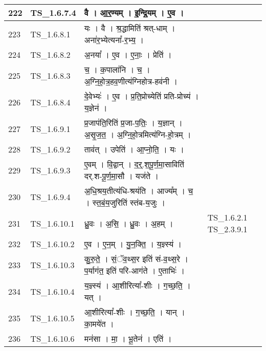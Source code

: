 \documentclass[17pt]{extarticle}
\begin{document}
\begin{longtable}{||p{0.4in}||p{0.9in}||p{4.0in}||p{0.9in}||}
        \hline
            222 & TS\_1.6.7.4 & वै   ।   आ॒र॒ण्यम्   ।   इ॒न्द्रि॒यम्   ।   ए॒व   ।    &      \\
        \hline
            223 & TS\_1.6.8.1 & यः   ।   वै   ।   श्र॒द्धामिति॑ श्रत्{-}धाम्   ।   अना॑र॒भ्येत्यना᳚{-}र॒भ्य॒   ।    &      \\
        \hline
            224 & TS\_1.6.8.2 & अ॒नया᳚   ।   ए॒व   ।   ए॒नाः॒   ।   प्रेति॑   ।    &      \\
        \hline
            225 & TS\_1.6.8.3 & च॒   ।   क॒पाला॑नि   ।   च॒   ।   अ॒ग्नि॒हो॒त्र॒हव॒णीत्य॑ग्निहोत्र{-}हव॑नी   ।    &      \\
        \hline
            226 & TS\_1.6.8.4 & दे॒वेभ्यः॑   ।   ए॒व   ।   प्र॒ति॒प्रोच्येति॑ प्रति{-}प्रोच्य॑   ।   य॒ज्ञेन॑   ।    &      \\
        \hline
            227 & TS\_1.6.9.1 & प्र॒जाप॑ति॒रिति॑ प्र॒जा{-}प॒तिः॒   ।   य॒ज्ञान्   ।   अ॒सृ॒ज॒त॒   ।   अ॒ग्नि॒हो॒त्रमित्य॑ग्नि{-}हो॒त्रम्   ।    &      \\
        \hline
            228 & TS\_1.6.9.2 & ताव॑त्   ।   उपेति॑   ।   आ॒प्नो॒ति॒   ।   यः   ।    &      \\
        \hline
            229 & TS\_1.6.9.3 & ए॒वम्   ।   वि॒द्वान्   ।   द॒र्॒.श॒पू॒र्ण॒मा॒साविति॑ दर्.श{-}पू॒र्ण॒मा॒सौ   ।   यज॑ते   ।    &      \\
        \hline
            230 & TS\_1.6.9.4 & अ॒धि॒श्रय॒तीत्य॑धि{-}श्रय॑ति   ।   आज्य᳚म्   ।   च॒   ।   स्त॒बं॒य॒जुरिति॑ स्तंब{-}य॒जुः   ।    &      \\
        \hline
            231 & TS\_1.6.10.1 & ध्रु॒वः   ।   अ॒सि॒   ।   ध्रु॒वः   ।   अ॒हम्   ।    & TS\_1.6.2.1  TS\_2.3.9.1       \\
        \hline
            232 & TS\_1.6.10.2 & ए॒व   ।   ए॒न॒म्   ।   यु॒न॒क्ति॒   ।   य॒ज्ञ्स्य॑   ।    &      \\
        \hline
            233 & TS\_1.6.10.3 & कु॒रु॒ते॒   ।   सं॒ॅव॒थ्स॒र इति॑ सं{-}व॒थ्स॒रे   ।   प॒र्याग॑त॒ इति॑ परि{-}आग॑ते   ।   ए॒ताभिः॑   ।    &      \\
        \hline
            234 & TS\_1.6.10.4 & य॒ज्ञ्स्य॑   ।   आ॒शीरित्या᳚{-}शीः   ।   ग॒च्छ॒ति॒   ।   यत्   ।    &      \\
        \hline
            235 & TS\_1.6.10.5 & आ॒शीरित्या᳚{-}शीः   ।   ग॒च्छ॒ति॒   ।   यान्   ।   का॒मये॑त   ।    &      \\
        \hline
            236 & TS\_1.6.10.6 & मन॑सा   ।   मा॒   ।   भू॒तेन॑   ।   एति॑   ।    &      \\
        \hline

\end{longtable}
\end{document}
